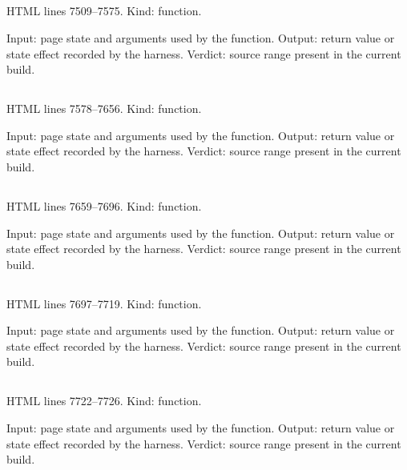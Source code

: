 \subsection*{\texttt{}}
\label{vf_382_mgViewSop}
HTML lines 7509--7575. Kind: function.

Input: page state and arguments used by the function.
Output: return value or state effect recorded by the harness.
Verdict: source range present in the current build.

\subsection*{\texttt{}}
\label{vf_383_mgViewResults}
HTML lines 7578--7656. Kind: function.

Input: page state and arguments used by the function.
Output: return value or state effect recorded by the harness.
Verdict: source range present in the current build.

\subsection*{\texttt{}}
\label{vf_384_mgPanelItems}
HTML lines 7659--7696. Kind: function.

Input: page state and arguments used by the function.
Output: return value or state effect recorded by the harness.
Verdict: source range present in the current build.

\subsection*{\texttt{}}
\label{vf_385_mgViewPanel}
HTML lines 7697--7719. Kind: function.

Input: page state and arguments used by the function.
Output: return value or state effect recorded by the harness.
Verdict: source range present in the current build.

\subsection*{\texttt{}}
\label{vf_386_mgGraphCtx}
HTML lines 7722--7726. Kind: function.

Input: page state and arguments used by the function.
Output: return value or state effect recorded by the harness.
Verdict: source range present in the current build.

